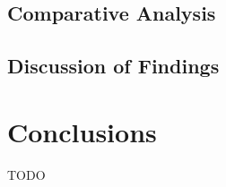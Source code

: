 \documentclass[10pt, conference]{IEEEtran}
\begin{document}
\subsection{Comparative Analysis}

\subsection{Discussion of Findings}

\section{Conclusions}
TODO



\end{document}
